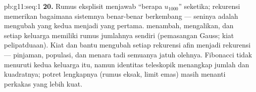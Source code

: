 \begin{solution}{pb:g11:seq:1}
\textbf{20.} Rumus eksplisit menjawab ``berapa $u_{1000}$''
seketika; rekurensi memerikan bagaimana sistemnya benar-benar berkembang ---
seninya adalah mengubah yang kedua menjadi yang pertama. 
menambah,  mengalikan, dan setiap keluarga memiliki
rumus jumlahnya sendiri (pemasangan Gauss; kiat pelipatduaan). Kiat
 dan  bantu mengubah setiap rekurensi afin
menjadi rekurensi  --- pinjaman, populasi, dan
menara tadi semuanya jatuh olehnya. Fibonacci tidak menuruti kedua keluarga
itu, namun identitas teleskopik menangkap jumlah dan kuadratnya; potret
lengkapnya (rumus eksak, limit emas) masih menanti perkakas yang lebih kuat.

\end{solution}
